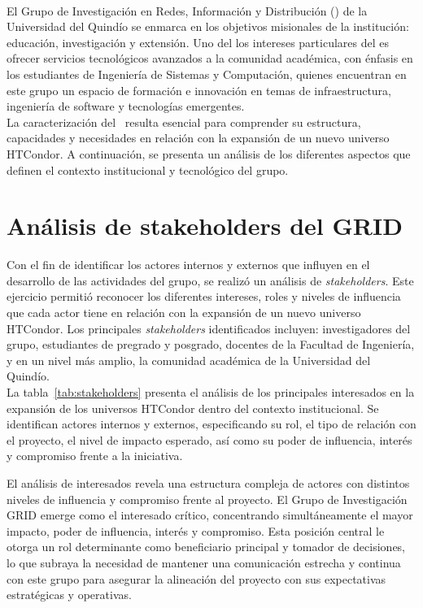 \label{cap:caracterizacionGRID}
\mbox{}\\
\noindent
El Grupo de Investigación en Redes, Información y Distribución (\GRID) de la Universidad del Quindío se enmarca en los objetivos misionales de la institución: educación, investigación y extensión. Uno del los intereses particulares del \GRID es ofrecer servicios tecnológicos avanzados a la comunidad académica, con énfasis en los estudiantes de Ingeniería de Sistemas y Computación, quienes encuentran en este grupo un espacio de formación e innovación en temas de infraestructura, ingeniería de software y tecnologías emergentes.\\
La caracterización del \GRID\ resulta esencial para comprender su estructura, capacidades y necesidades en relación con la expansión de un nuevo universo HTCondor. A continuación, se presenta un análisis de los diferentes aspectos que definen el contexto institucional y tecnológico del grupo.

\section{Análisis de stakeholders del GRID}
\noindent
Con el fin de identificar los actores internos y externos que influyen en el desarrollo de las actividades del grupo, se realizó un análisis de \textit{stakeholders}. Este ejercicio permitió reconocer los diferentes intereses, roles y niveles de influencia que cada actor tiene en relación con la expansión de un nuevo universo HTCondor. Los principales \textit{stakeholders} identificados incluyen: investigadores del grupo, estudiantes de pregrado y posgrado, docentes de la Facultad de Ingeniería, y en un nivel más amplio, la comunidad académica de la Universidad del Quindío.
\\
\noindent
La tabla~\ref{tab:stakeholders} presenta el análisis de los principales interesados en la expansión de los universos HTCondor dentro del contexto institucional. Se identifican actores internos y externos, especificando su rol, el tipo de relación con el proyecto, el nivel de impacto esperado, así como su poder de influencia, interés y compromiso frente a la iniciativa.

El análisis de interesados revela una estructura compleja de actores con distintos niveles de influencia y compromiso frente al proyecto. El Grupo de Investigación GRID emerge como el interesado crítico, concentrando simultáneamente el mayor impacto, poder de influencia, interés y compromiso. Esta posición central le otorga un rol determinante como beneficiario principal y tomador de decisiones, lo que subraya la necesidad de mantener una comunicación estrecha y continua con este grupo para asegurar la alineación del proyecto con sus expectativas estratégicas y operativas.

